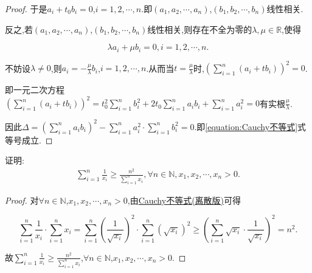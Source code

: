 \documentclass[../../main.tex]{subfiles}%
\begin{document}
\begin{proof}
于是\(a_i + t_0b_i = 0\),\(i = 1,2,\cdots,n\).即\((a_1,a_2,\cdots,a_n)\),\((b_1,b_2,\cdots,b_n)\)线性相关.

反之,若\((a_1,a_2,\cdots,a_n)\),\((b_1,b_2,\cdots,b_n)\)线性相关,则存在不全为零的\(\lambda,\mu \in \mathbb{R}\),使得

\[
\lambda a_i + \mu b_i = 0,  i = 1,2,\cdots,n.
\]

不妨设\(\lambda \neq 0\),则\(a_i = -\frac{\mu}{\lambda}b_i\),\(i = 1,2,\cdots,n\).从而当\(t = \frac{\mu}{\lambda}\)时,\(\left(\sum\limits_{i = 1}^{n}(a_i + tb_i)\right)^2 = 0\).

即一元二次方程\(\left(\sum\limits_{i = 1}^{n}(a_i + tb_i)\right)^2 = t_{0}^{2}\sum\limits_{i = 1}^{n}b_{i}^{2} + 2t_0\sum\limits_{i = 1}^{n}a_ib_i + \sum\limits_{i = 1}^{n}a_{i}^{2} = 0\)有实根\(\frac{\mu}{\lambda}\).

因此\(\Delta = \left(\sum\limits_{i = 1}^{n}a_ib_i\right)^2 - \sum\limits_{i = 1}^{n}a_{i}^{2} \cdot \sum\limits_{i = 1}^{n}b_{i}^{2} = 0\).即\eqref{equation:Cauchy不等式}式等号成立.
\end{proof}

\begin{example}
证明:\begin{align*}
\sum\limits_{i=1}^n{\frac{1}{x_i}}\geqslant \frac{n^2}{\sum\limits_{i=1}^n{x_i}},\forall n\in \mathbb{N} ,x_1,x_2,\cdots ,x_n>0.
\end{align*}
\end{example}
\begin{proof}
对\(\forall n \in \mathbb{N}\),\(x_1,x_2,\cdots,x_n > 0\),由\hyperref[theorem:Cauchy不等式(离散版)]{Cauchy不等式(离散版)}可得

\[
\sum\limits_{i = 1}^{n}\frac{1}{x_i} \cdot \sum\limits_{i = 1}^{n}x_i = \sum\limits_{i = 1}^{n}\left(\frac{1}{\sqrt{x_i}}\right)^2 \cdot \sum\limits_{i = 1}^{n}\left(\sqrt{x_i}\right)^2 \geqslant \left(\sum\limits_{i = 1}^{n}\sqrt{x_i} \cdot \frac{1}{\sqrt{x_i}}\right)^2 = n^2.
\]

故\(\sum\limits_{i = 1}^{n}\frac{1}{x_i} \geqslant \frac{n^2}{\sum\limits_{i = 1}^{n}x_i}\),\(\forall n \in \mathbb{N}\),\(x_1,x_2,\cdots,x_n > 0\). 
\end{proof}
\end{document}
